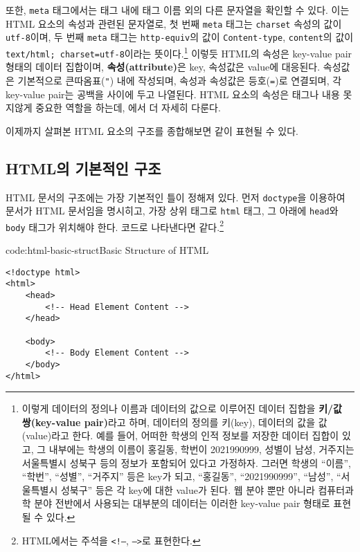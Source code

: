 또한, \texttt{meta} 태그에서는 태그 내에 태그 이름 외의 다른 문자열을 확인할 수 있다. 이는 HTML 요소의 속성과 관련된 문자열로, 첫 번째 \texttt{meta} 태그는 \texttt{charset} 속성의 값이 \texttt{utf-8}이며, 두 번째 \texttt{meta} 태그는 \texttt{http-equiv}의 값이 \texttt{Content-type}, \texttt{content}의 값이 \verb|text/html; charset=utf-8|이라는 뜻이다.\footnote{이렇게 데이터의 정의나 이름과 데이터의 값으로 이루어진 데이터 집합을 \textbf{키/값 쌍(key-value pair)}라고 하며, 데이터의 정의를 키(key), 데이터의 값을 값(value)라고 한다. 예를 들어, 어떠한 학생의 인적 정보를 저장한 데이터 집합이 있고, 그 내부에는 학생의 이름이 홍길동, 학번이 2021990999, 성별이 남성, 거주지는 서울특별시 성북구 등의 정보가 포함되어 있다고 가정하자. 그러면 학생의 ``이름'', ``학번'', ``성별'', ``거주지'' 등은 key가 되고, ``홍길동'', ``2021990999'', ``남성'', ``서울특별시 성북구'' 등은 각 key에 대한 value가 된다. 웹 분야 뿐만 아니라 컴퓨터과학 분야 전반에서 사용되는 대부분의 데이터는 이러한 key-value pair 형태로 표현될 수 있다.} 이렇듯 HTML의 속성은 key-value pair 형태의 데이터 집합이며, \textbf{속성(attribute)}은 key, 속성값은 value에 대응된다. 속성값은 기본적으로 큰따옴표(\texttt{"}) 내에 작성되며, 속성과 속성값은 등호(\texttt{=})로 연결되며, 각 key-value pair는 공백을 사이에 두고 나열된다. HTML 요소의 속성은 태그나 내용 못지않게 중요한 역할을 하는데, 에서 더 자세히 다룬다.

이제까지 살펴본 HTML 요소의 구조를 종합해보면 \와 같이 표현될 수 있다.

    {}

\subsection*{HTML의 기본적인 구조}
HTML 문서의 구조에는 가장 기본적인 틀이 정해져 있다. 먼저 \texttt{doctype}을 이용하여 문서가 HTML 문서임을 명시히고, 가장 상위 태그로 \texttt{html} 태그, 그 아래에 \texttt{head}와 \texttt{body} 태그가 위치해야 한다. 코드로 나타낸다면 \와 같다.\footnote{HTML에서는 주석을 \texttt{<!--}, \texttt{-->}로 표현한다.}

\begin{codeenv}{code:html-basic-struct}{Basic Structure of HTML}
\begin{verbatim}
<!doctype html>
<html>
    <head>
        <!-- Head Element Content -->
    </head>

    <body>
        <!-- Body Element Content -->
    </body>
</html>
\end{verbatim}
\end{codeenv}

